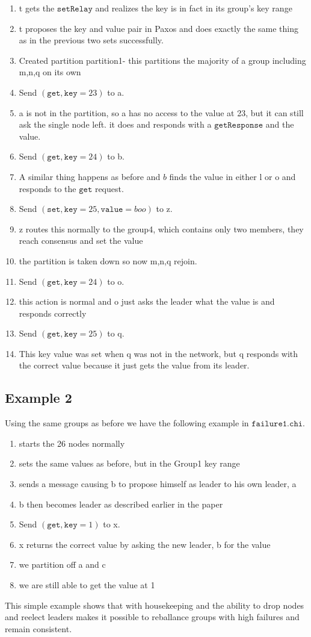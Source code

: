 \documentclass{amsart}
\theoremstyle{definition}
\theoremstyle{remark}
\numberwithin{equation}{section}
\begin{document}
\begin{enumerate}
\item t gets the $\mathtt{setRelay}$ and realizes the key is in fact in its group's key range
\item t proposes the key and value pair in Paxos and does exactly the same thing as in the previous two sets successfully.
\item Created partition partition1- this partitions the majority of a group including m,n,q on its own
\item Send $(\mathtt{get}, \mathtt{key}=23)$ to a.
\item a is not in the partition, so a has no access to the value at 23, but it can still ask the single node left. it does and responds with a $\mathtt{getResponse}$ and the value.
\item Send $(\mathtt{get}, \mathtt{key}=24)$ to b.
\item A similar thing happens as before and $b$ finds the value in either l or o and responds to the $\mathtt{get}$ request.
\item Send $(\mathtt{set}, \mathtt{key}=25, \mathtt{value}=boo)$ to z.
\item z routes this normally to the group4, which contains only two members, they reach consensus and set the value
\item the partition is taken down so now m,n,q rejoin.
\item Send $(\mathtt{get}, \mathtt{key}=24)$ to o.
\item this action is normal and o just asks the leader what the value is and responds correctly
\item  Send $(\mathtt{get}, \mathtt{key}=25)$ to q.
\item This key value was set when q was not in the network, but q responds with the correct value because it just gets the value from its leader.
\end{enumerate}
\subsection{Example 2}
Using the same groups as before we have the following example in $\mathtt{failure1.chi}$.
\begin{enumerate}
\item starts the 26 nodes normally
\item sets the same values as before, but in the Group1 key range
\item sends a message causing b to propose himself as leader to his own leader, a
\item b then becomes leader as described earlier in the paper
\item Send $(\mathtt{get}, \mathtt{key}=1)$ to x.
\item x returns the correct value by asking the new leader, b for the value
\item we partition off a and c
\item we are still able to get the value at 1
\end{enumerate}
This simple example shows that with housekeeping and the ability to drop nodes and reelect leaders makes it possible to reballance groups with high failures and remain consistent. 
\end{document}
